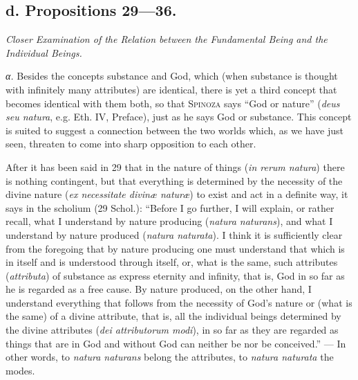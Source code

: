 \documentclass[12pt]{article}
\newcommand{\opage}[1]{\marginnote{\footnotesize\textit{[#1]}}}
\begin{document}
\subsection*{d. Propositions 29---36.}
\begin{center}\textit{Closer Examination of the Relation between the Fundamental Being
and the Individual Beings.}\end{center}

\textit{α.} Besides the concepts substance and God, which (when substance is thought
with infinitely many attributes) are identical, there is yet a third concept that
becomes identical with them both, so that \textsc{Spinoza} says ``God or nature''
(\textit{deus seu natura}, e.g. Eth. IV, Preface), just as he says God or substance.
This concept is suited to suggest a connection between the two worlds which, as we have
just seen, threaten to come into sharp opposition to each other.

After it has been said in 29 that in the nature of things (\textit{in rerum natura})
there is nothing contingent, but that everything is determined by the necessity of the
divine nature (\textit{ex necessitate divinæ naturæ}) to exist and act in a definite
way, it says in the scholium (29 Schol.): ``Before I go further, I will explain, or
rather recall, what I understand by nature producing (\textit{natura naturans}), and
what I understand by nature produced (\textit{natura naturata}). I think it is
sufficiently clear from the foregoing that by nature producing one must understand that
which is in itself and is understood through itself, or, what is the same, such
attributes (\textit{attributa}) of substance as express eternity and infinity, that is,
God in so far as he is regarded as a free cause. By nature produced, on the other hand, I
understand everything that follows from the necessity of God's nature or (what is
\opage{29}the same) of a divine attribute, that is, all the individual beings determined
by the divine attributes (\textit{dei attributorum modi}), in so far as they are regarded
as things that are in God and without God can neither be nor be conceived.'' --- In other
words, to \textit{natura naturans} belong the attributes, to \textit{natura naturata}
the modes.
\end{document}
